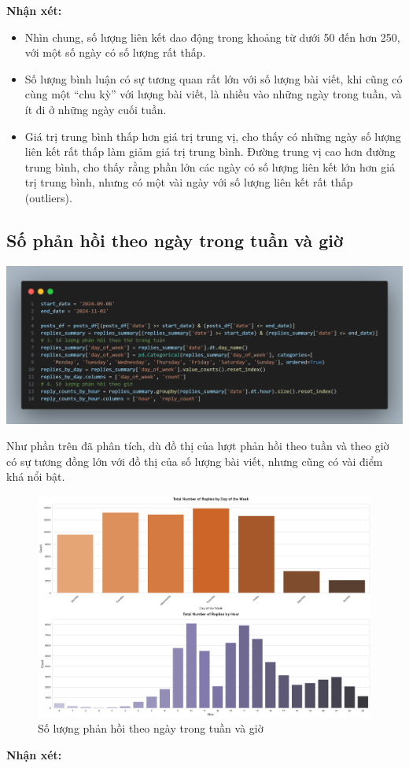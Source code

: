 \textbf{Nhận xét:}

\begin{itemize}
    \item Nhìn chung, số lượng liên kết dao động trong khoảng từ dưới 50 đến hơn 250, với một số ngày có số lượng rất thấp.
    \item Số lượng bình luận có sự tương quan rất lớn với số lượng bài viết, khi cũng có cùng một ``chu kỳ'' với lượng bài viết, là nhiều vào những ngày trong tuần, và ít đi ở những ngày cuối tuần.
    \item Giá trị trung bình thấp hơn giá trị trung vị, cho thấy có những ngày số lượng liên kết rất thấp làm giảm giá trị trung bình. Đường trung vị cao hơn đường trung bình, cho thấy rằng phần lớn các ngày có số lượng liên kết lớn hơn giá trị trung bình, nhưng có một vài ngày với số lượng liên kết rất thấp (outliers).
\end{itemize}

\subsection{Số phản hồi theo ngày trong tuần và giờ}

\begin{center}
    \includegraphics[width=1\linewidth]{images/code-2.23.png}
\end{center}

Như phần trên đã phân tích, dù đồ thị của lượt phản hồi theo tuần và theo giờ có sự tương đồng lớn với đồ thị của số lượng bài viết, nhưng cũng có vài điểm khá nổi bật.

\begin{figure}[H]
    \centering
    \includegraphics[width=1\linewidth]{images/plot-2.24-column_chart_merge.png}
    \caption{Số lượng phản hồi theo ngày trong tuần và giờ}
    \label{fig:2.9}
\end{figure}
\textbf{Nhận xét:}

